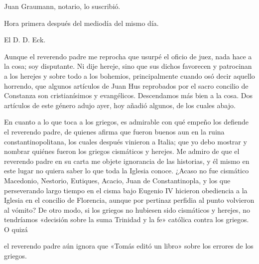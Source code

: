 Juan Graumann, notario, lo suscribió.

Hora primera después del mediodía del mismo día.

El D. D. Eck.

Aunque el reverendo padre me reprocha que usurpé el oficio de juez, nada hace a la cosa; soy disputante. Ni dije hereje, sino que sus dichos favorecen y patrocinan a los herejes y sobre todo a los bohemios, principalmente cuando osó decir aquello horrendo, que algunos artículos de Juan Hus reprobados por el sacro concilio de Constanza son cristianísimos y evangélicos. Descendamos más bien a la cosa. Dos artículos de este género adujo ayer, hoy añadió algunos, de los cuales abajo.

En cuanto a lo que toca a los griegos, es admirable con qué empeño los defiende el reverendo padre, de quienes afirma que fueron buenos aun en la ruina constantinopolitana, los cuales después vinieron a Italia; que yo debo mostrar y nombrar quiénes fueron los griegos cismáticos y herejes. Me admiro de que el reverendo padre en su carta me objete ignorancia de las historias, y él mismo en este lugar no quiera saber lo que toda la Iglesia conoce. ¿Acaso no fue cismático Macedonio, Nestorio, Eutiques, Acacio, Juan de Constantinopla, y los que perseverando largo tiempo en el cisma bajo Eugenio IV hicieron obediencia a la Iglesia en el concilio de Florencia, aunque por pertinaz perfidia al punto volvieron al vómito? De otro modo, si los griegos no hubiesen sido cismáticos y herejes, no tendríamos «decisión sobre la suma Trinidad y la fe» católica contra los griegos. O quizá

el reverendo padre aún ignora que «Tomás editó un libro» sobre los errores de los griegos.


